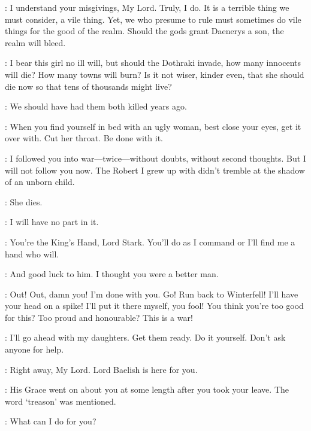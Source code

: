 \VARYS: I understand your misgivings, My Lord. Truly, I do. It is a terrible thing we must consider, a vile thing. Yet, we who presume to rule must sometimes do vile things for the good of the realm. Should the gods grant Daenerys a son, the realm will bleed. 

\PYCELLE: I bear this girl no ill will, but should the Dothraki invade, how many innocents will die? How many towns will burn? Is it not wiser, kinder even, that she should die now so that tens of thousands might live? 

\RENLY: We should have had them both killed years ago. 

\LITTLEFINGER: When you find yourself in bed with an ugly woman, best close your eyes, get it over with. Cut her throat. Be done with it. 

\NED: I followed you into war---twice---without doubts, without second thoughts. But I will not follow you now. The Robert I grew up with didn't tremble at the shadow of an unborn child. 

\ROBERT: She dies. 

\NED: I will have no part in it. 

\ROBERT: You're the King's Hand, Lord Stark. You'll do as I command or I'll find me a hand who will. 


\NED: And good luck to him. I thought you were a better man. 

\ROBERT: Out! Out, damn you! I'm done with you.  Go! Run back to Winterfell! I'll have your head on a spike! I'll put it there myself, you fool! You think you're too good for this? Too proud and honourable? This is a war!


\scene



\NED: I'll go ahead with my daughters. Get them ready. Do it yourself. Don't ask anyone for help. 

\JORY: Right away, My Lord. Lord Baelish is here for you. 


\LITTLEFINGER: His Grace went on about you at some length after you took your leave. The word `treason' was mentioned. 

\NED: What can I do for you? 

